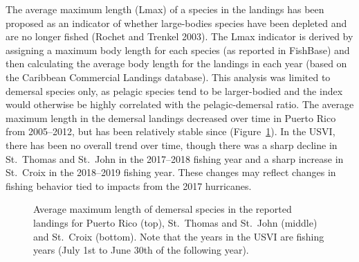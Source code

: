 \documentclass[
  letterpaper,
  oneside,
  open=any]{scrbook}
\begin{document}
The average maximum length (Lmax) of a species in the landings has been
proposed as an indicator of whether large-bodies species have been
depleted and are no longer fished (Rochet and Trenkel 2003). The Lmax
indicator is derived by assigning a maximum body length for each species
(as reported in FishBase) and then calculating the average body length
for the landings in each year (based on the Caribbean Commercial
Landings database). This analysis was limited to demersal species only,
as pelagic species tend to be larger-bodied and the index would
otherwise be highly correlated with the pelagic-demersal ratio. The
average maximum length in the demersal landings decreased over time in
Puerto Rico from 2005--2012, but has been relatively stable since
(Figure~\ref{fig-avgLmax}). In the USVI, there has been no overall trend
over time, though there was a sharp decline in St.~Thomas and St.~John
in the 2017--2018 fishing year and a sharp increase in St.~Croix in the
2018--2019 fishing year. These changes may reflect changes in fishing
behavior tied to impacts from the 2017 hurricanes.

\begin{figure}


\caption{\label{fig-avgLmax}Average maximum length of demersal species
in the reported landings for Puerto Rico (top), St.~Thomas and St.~John
(middle) and St.~Croix (bottom). Note that the years in the USVI are
fishing years (July 1st to June 30th of the following year).}

\end{figure}%
\end{document}
